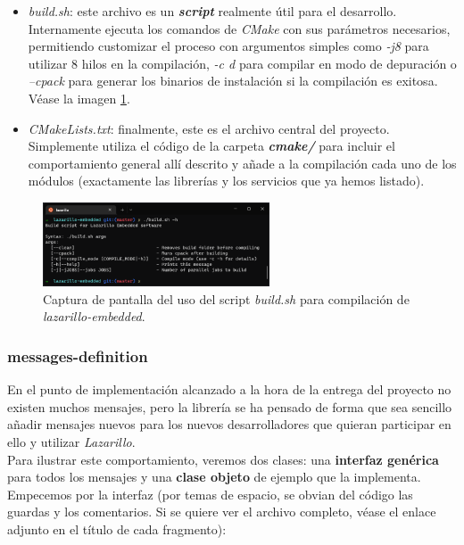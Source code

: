 \begin{itemize}
	\item \textit{build.sh}: este archivo es un \textbf{\textit{script}} realmente útil para el desarrollo. Internamente ejecuta los comandos de \textit{CMake} con sus parámetros necesarios, permitiendo customizar el proceso con argumentos simples como \emph{-j8} para utilizar 8 hilos en la compilación, \emph{-c d} para compilar en modo de depuración o \emph{--cpack} para generar los binarios de instalación si la compilación es exitosa. Véase la imagen \ref{lazarillo-build-sh}.
	\item \textit{CMakeLists.txt}: finalmente, este es el archivo central del proyecto. Simplemente utiliza el código de la carpeta \textbf{\textit{cmake/}} para incluir el comportamiento general allí descrito y añade a la compilación cada uno de los módulos (exactamente las librerías y los servicios que ya hemos listado).
\end{itemize}

\begin{figure}[h]
	\centering
	\includegraphics[width=0.6\textwidth]{imagenes/lazarillo-build-sh.png}
	\caption{Captura de pantalla del uso del script \emph{build.sh} para compilación de \textit{lazarillo-embedded}.}
	\label{lazarillo-build-sh}
\end{figure}

\subsubsection{messages-definition}

En el punto de implementación alcanzado a la hora de la entrega del proyecto no existen muchos mensajes, pero la librería se ha pensado de forma que sea sencillo añadir mensajes nuevos para los nuevos desarrolladores que quieran participar en ello y utilizar \textit{Lazarillo}.\\

Para ilustrar este comportamiento, veremos dos clases: una \textbf{interfaz genérica} para todos los mensajes y una \textbf{clase objeto} de ejemplo que la implementa. Empecemos por la interfaz (por temas de espacio, se obvian del código las guardas y los comentarios. Si se quiere ver el archivo completo, véase el enlace adjunto en el título de cada fragmento):\\

